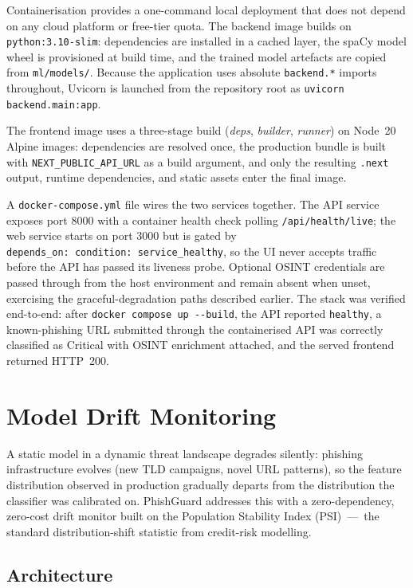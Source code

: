 Containerisation provides a one-command local deployment that does not
depend on any cloud platform or free-tier quota. The backend image builds
on \texttt{python:3.10-slim}: dependencies are installed in a cached
layer, the spaCy model wheel is provisioned at build time, and the trained
model artefacts are copied from \texttt{ml/models/}. Because the
application uses absolute \texttt{backend.*} imports throughout, Uvicorn
is launched from the repository root as \texttt{uvicorn
backend.main:app}.

The frontend image uses a three-stage build (\emph{deps}, \emph{builder},
\emph{runner}) on Node~20 Alpine images: dependencies are resolved once,
the production bundle is built with \texttt{NEXT\_PUBLIC\_API\_URL} as a
build argument, and only the resulting \texttt{.next} output, runtime
dependencies, and static assets enter the final image.

A \texttt{docker-compose.yml} file wires the two services together. The
API service exposes port 8000 with a container health check polling
\texttt{/api/health/live}; the web service starts on port 3000 but is
gated by \texttt{depends\_on:\ condition:\ service\_healthy}, so the UI
never accepts traffic before the API has passed its liveness probe.
Optional OSINT credentials are passed through from the host environment
and remain absent when unset, exercising the graceful-degradation paths
described earlier. The stack was verified end-to-end: after
\texttt{docker compose up -\/-build}, the API reported \texttt{healthy},
a known-phishing URL submitted through the containerised API was correctly
classified as Critical with OSINT enrichment attached, and the served
frontend returned HTTP~200.

\section{Model Drift Monitoring}\label{drift-monitoring}

A static model in a dynamic threat landscape degrades silently: phishing
infrastructure evolves (new TLD campaigns, novel URL patterns), so the
feature distribution observed in production gradually departs from the
distribution the classifier was calibrated on. PhishGuard addresses this
with a zero-dependency, zero-cost drift monitor built on the Population
Stability Index (PSI)~---~the standard distribution-shift statistic from
credit-risk modelling.

\subsection{Architecture}

